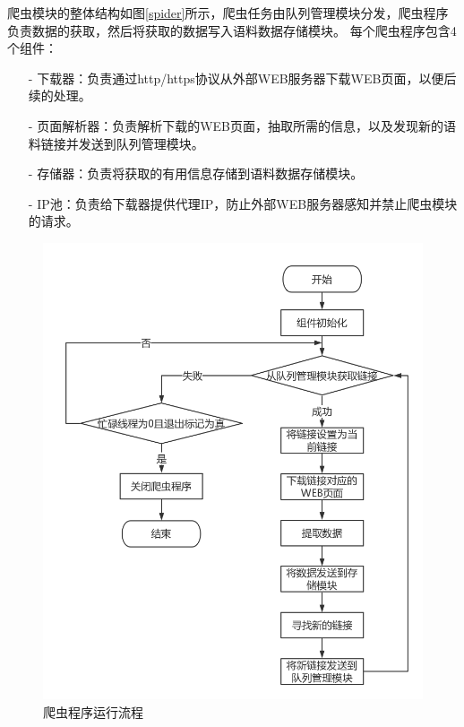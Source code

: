 \documentclass{standalone}
\begin{document}
爬虫模块的整体结构如图\ref{spider}所示，爬虫任务由队列管理模块分发，爬虫程序
负责数据的获取，然后将获取的数据写入语料数据存储模块。
每个爬虫程序包含4个组件：
\begin{itemize}
    \item[-] 下载器：负责通过http/https协议从外部WEB服务器下载WEB页面，以便后续的处理。
    \item[-] 页面解析器：负责解析下载的WEB页面，抽取所需的信息，以及发现新的语料链接并发送到队列管理模块。
    \item[-] 存储器：负责将获取的有用信息存储到语料数据存储模块。
    \item[-] IP池：负责给下载器提供代理IP，防止外部WEB服务器感知并禁止爬虫模块的请求。
\end{itemize}
\begin{figure}[!hbp]
    \includegraphics[scale=0.4]{picture/spider_flowchart.png}
    \caption{爬虫程序运行流程}
    \label{spider_flowchart}
\end{figure}
\end{document}
